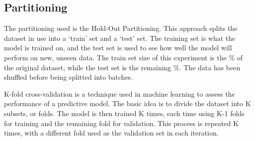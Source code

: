 \documentclass[12pt, a4paper]{article}
\begin{document}



\subsection{Partitioning}\label{subsec:partitioning}


The partitioning used is the Hold-Out Partitioning.
This approach splits the dataset in use into a ‘train’ set and a ‘test’ set.
The training set is what the model is trained on, and the test set is used to see how
well the model will perform on new, unseen data.
\hfill\break
\hfill\break
The train set size of this experiment is the \%
of the original dataset, while the test set is the remaining \%.
\hfill\break
\hfill\break
{}
The data has been shuffled before being splitted into batches.


K-fold cross-validation is a technique used in machine learning to assess
the performance of a predictive model. The basic idea is to divide the dataset
into K subsets, or folds. The model is then trained K times, each time using K-1
folds for training and the remaining fold for validation. This process is
repeated K times, with a different fold used as the validation set in each iteration.
\end{document}
